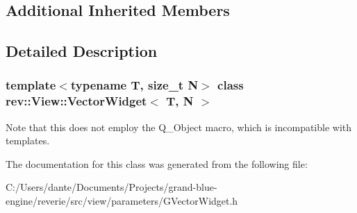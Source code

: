 \subsection*{Additional Inherited Members}


\subsection{Detailed Description}
\subsubsection*{template$<$typename T, size\+\_\+t N$>$\newline
class rev\+::\+View\+::\+Vector\+Widget$<$ T, N $>$}

Note that this does not employ the Q\+\_\+\+Object macro, which is incompatible with templates. 

The documentation for this class was generated from the following file\+:\begin{DoxyCompactItemize}
\item 
C\+:/\+Users/dante/\+Documents/\+Projects/grand-\/blue-\/engine/reverie/src/view/parameters/G\+Vector\+Widget.\+h\end{DoxyCompactItemize}
